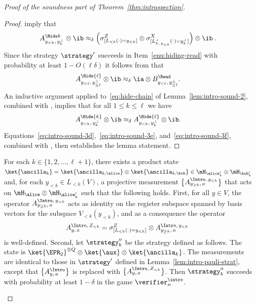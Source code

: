 \begin{proof}[Proof of the soundness part of Theorem~\ref{thm:introspection}]
  \begin{proof}
     imply that
    \begin{equation}\label{eq:intro-sound-3d}
      \ahk[y_{<k},\, y^\perp_k] \otimes \ib \approx_\delta
      \Bigl( \zLlk \otimes \xLperpk \Bigr) \otimes \ib\:.
    \end{equation}
    Since the strategy $\strategy'$ succeeds in Item~\ref{enu:hiding-read} with
    probability at least $1 - O(\ell \delta)$ it follows from
     that
    \begin{equation}\label{eq:intro-sound-3e}
      A^{\Hide{\ell}}_{y_{<\ell},\, y^\perp_{\leq \ell}} \otimes \ib
      \approx_\delta \ia \otimes \br[y_{<\ell},\, y^\perp_{\leq
          \ell}].
    \end{equation}
    An inductive argument applied to~\eqref{eq:hide-chain} of
    Lemma~\ref{lem:intro-sound-2}, combined with ,
    implies that for all $1 \leq k \leq \ell$ we have
    \begin{equation}\label{eq:intro-sound-3f}
      A^{\Hide{k}}_{y_{<k},\, y^\perp_{k}} \otimes \ib \approx_\delta A^{\Hide{
          \ell}}_{y_{<k},\, y^\perp_{k}} \otimes \ib.
    \end{equation}
    Equations~\eqref{eq:intro-sound-3d},~\eqref{eq:intro-sound-3e},
    and~\eqref{eq:intro-sound-3f}, combined with ,
    then establishes the lemma statement.
  \end{proof}

  \begin{lemma}
    \label{lem:intro-sound-induction}
    For each $k\in \{1, 2, \ldots, \ell+1\}$, there exists a product state
    $\ket{\ancilla_k} = \ket{\ancilla_{k,\alice}} \otimes
    \ket{\ancilla_{k,\bob}} \in \mH_{\alice'_k} \otimes \mH_{\bob'_k}$ and, for
    each $y_{<k} \in L_{<k}(V)$, a projective measurement $\bigl\{\aigek
    \bigr\}$ that acts on $\mH_{\alice} \otimes \mH_{\alice'_k}$ such that the
    following holds.
		First, for all $y \in V$, the operator $\aigek$ acts as identity on the
    register subspace spanned by basis vectors for the subspace $V_{<
      k}(y_{<k})$, and as a consequence the operator
    \begin{equation}\label{eq:intro-sound-4aa}
      \aizk = \zLlk \otimes \aigek\;
    \end{equation}
    is well-defined.
    Second, let $\strategy''_k$ be the strategy defined as follows.
    The state is $\ket{\EPR_2}^{\otimes Q} \otimes \ket{\aux} \otimes
    \ket{\ancilla_k}$.
    The measurements are identical to those in $\strategy'$ defined in
    Lemma~\ref{lem:intro-pauli-strat}, except that $\bigl\{ \ai \bigr\}$ is
    replaced with $\bigl\{ \aizk \bigr\}$.
    Then $\strategy''_k$ succeeds with probability at least $1-\delta$ in the
    game $\verifier_n^\intro$.
  \end{lemma}
  

\end{proof}
